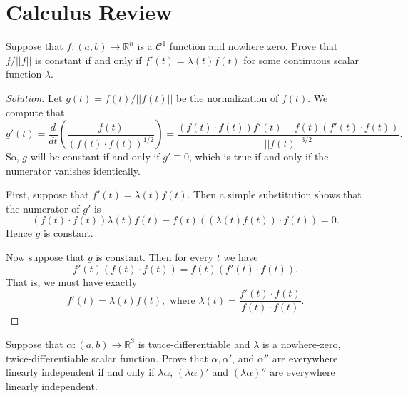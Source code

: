 \documentclass[Shifrin_Solutions_Spring_2015]{subfiles}
\begin{document}
\section{Calculus Review}

\begin{exercise}
Suppose that $f:(a,b) \rightarrow \mathbb{R}^n$ is a $\mathcal{C}^1$ function and nowhere zero. Prove that $f / ||f|| $ is constant if and only if $f'(t) = \lambda(t) f(t)$ for some continuous scalar function $\lambda$.
\end{exercise}

\begin{proof}[Solution]
Let $g(t) = f(t) / ||f(t)||$ be the normalization of $f(t)$. We compute that
\[
g'(t) = \dfrac{d}{dt} \left( \dfrac{f(t)}{ ( f(t) \cdot f(t) )^{1/2} }\right) = \dfrac{(f(t)\cdot f(t) ) f'(t) - f(t) ( f'(t) \cdot f(t) )}{||f(t)||^{3/2}} .
\]
So, $g$ will be constant if and only if $g' \equiv 0$, which is true if and only if the numerator vanishes identically.

First, suppose that $f'(t) =\lambda(t) f(t)$. Then a simple substitution shows that the numerator of $g'$ is
\[
(f(t)\cdot f(t) ) \lambda(t)f(t) - f(t) ( (\lambda(t)f(t)) \cdot f(t) ) = 0.
\]
Hence $g$ is constant.

Now suppose that $g$ is constant. Then for every $t$ we have
\[
f'(t) (f(t)\cdot f(t) ) =  f(t) (f'(t) \cdot f(t) ) .
\]
That is, we must have exactly
\[
f'(t) = \lambda(t) f(t) , \text{ where } \lambda(t) = \dfrac{f'(t)\cdot f(t)}{f(t)\cdot f(t)} .
\]
\end{proof}

\vspace{1cm}



\begin{exercise}
Suppose that $\alpha: (a,b) \rightarrow \mathbb{R}^3$ is twice-differentiable and $\lambda$ is a nowhere-zero, twice-differentiable scalar function. Prove that $\alpha, \alpha'$, and $\alpha''$ are everywhere linearly independent if and only if $\lambda\alpha$, $(\lambda \alpha)'$ and $(\lambda \alpha)''$ are everywhere linearly independent.
\end{exercise}
\end{document}
